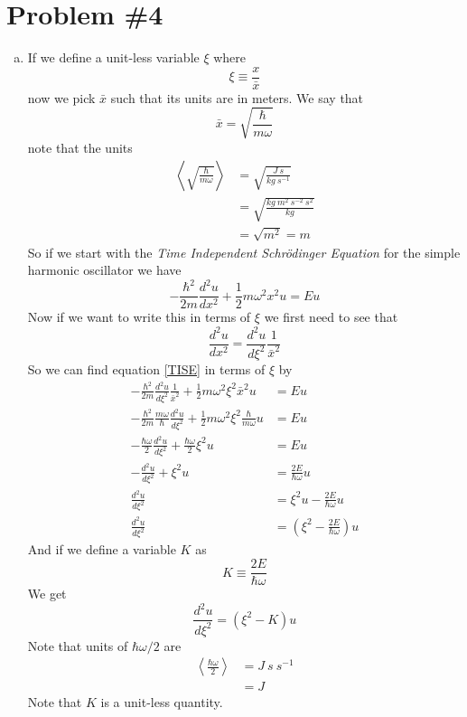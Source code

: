 \documentclass[11pt]{article}
\numberwithin{equation}{section}
\begin{document}
\section{Problem \#4}
\begin{enumerate}[(a)]
\item
If we define a unit-less variable $\xi$ where
$$\xi\equiv\frac{x}{\bar{x}}$$
now we pick $\bar{x}$ such that its units are in meters. We say that
$$\bar{x} = \sqrt{\frac{\hbar}{m\omega}}$$
note that the units 
\begin{align*}
\left<\sqrt{\frac{\hbar}{m\omega}}\right> &= \sqrt{\frac{J\ s}{kg\ s^{-1}}}\\
&= \sqrt{\frac{kg\ m^2\ s^{-2}\ s^2}{kg}}\\
&= \sqrt{m^2} = m
\end{align*}
So if we start with the \emph{Time Independent Schr\"{o}dinger Equation} for the simple harmonic oscillator we have
\begin{equation}
-\frac{\hbar^2}{2m}\frac{d^2u}{dx^2}+\frac{1}{2}m\omega^2x^2u = Eu
\label{TISE}
\end{equation}
Now if we want to write this in terms of $\xi$ we first need to see that
$$\frac{d^2u}{dx^2} = \frac{d^2u}{d\xi^2}\frac{1}{\bar{x}^2}$$
So we can find equation \ref{TISE} in terms of $\xi$ by
\begin{align*}
-\frac{\hbar^2}{2m}\frac{d^2u}{d\xi^2}\frac{1}{\bar{x}^2}+\frac{1}{2}m\omega^2\xi^2\bar{x}^2u &= Eu\\
-\frac{\hbar^2}{2m}\frac{m\omega}{\hbar}\frac{d^2u}{d\xi^2}+\frac{1}{2}m\omega^2\xi^2\frac{\hbar}{m\omega}u &= Eu\\
-\frac{\hbar\omega}{2}\frac{d^2u}{d\xi^2}+\frac{\hbar\omega}{2}\xi^2u &= Eu\\
-\frac{d^2u}{d\xi^2}+\xi^2u &= \frac{2E}{\hbar\omega}u\\
\frac{d^2u}{d\xi^2} &= \xi^2u - \frac{2E}{\hbar\omega}u\\
\frac{d^2u}{d\xi^2} &= \left(\xi^2 - \frac{2E}{\hbar\omega}\right)u
\end{align*}
And if we define a variable $K$ as
$$K\equiv\frac{2E}{\hbar\omega}$$
We get
$$\frac{d^2u}{d\xi^2} = \left(\xi^2 - K\right)u$$
Note that units of $\hbar\omega/2$ are
\begin{align*}
\left<\frac{\hbar\omega}{2}\right> &= J\ s\ s^{-1}\\
&= J
\end{align*}
Note that $K$ is a unit-less quantity.


\end{enumerate}
\end{document}
